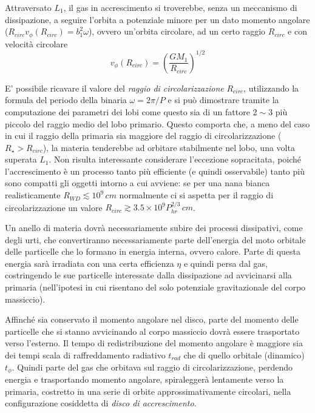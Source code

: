 \documentclass[a4paperbi]{article}
\begin{document}
	Attraversato $L_1$, il gas in accrescimento si troverebbe, senza un meccanismo di dissipazione, a seguire l'orbita a potenziale minore per un dato momento angolare ($R_{circ}v_\phi(R_{circ})=b_1^2\omega$), ovvero un'orbita circolare, ad un certo raggio $R_{circ}$ e con velocità circolare
	\begin{equation}
		v_\phi(R_{circ})=\left(\frac{GM_1}{R_{circ}}\right)^{1/2}
	\end{equation}
	
	E' possibile ricavare il valore del \textit{raggio di circolarizzazione} $R_{circ}$, utilizzando la formula del periodo della binaria $\omega=2\pi/P$ e si può dimostrare tramite la computazione dei parametri dei lobi come questo sia di un fattore $2\sim3$ più piccolo del raggio medio del lobo primario. Questo comporta che, a meno del caso in cui il raggio della primaria sia maggiore del raggio di circolarizzazione ($R_\star>R_{circ}$), la materia tenderebbe ad orbitare stabilmente nel lobo, una volta superata $L_1$.
	Non risulta interessante considerare l'eccezione sopracitata, poiché l'accrescimento è un processo tanto più efficiente (e quindi osservabile) tanto più sono compatti gli oggetti intorno a cui avviene: se per una nana bianca realisticamente $R_{WD}\lesssim10^9\,cm$ normalmente ci si aspetta per il raggio di circolarizzazione un valore $R_{circ}\gtrsim3.5\times10^9P_{hr}^{2/3}\,cm$.

	Un anello di materia dovrà necessariamente subire dei processi dissipativi, come degli urti, che convertiranno necessariamente parte dell'energia del moto orbitale delle particelle che lo formano in energia interna, ovvero calore. Parte di questa energia sarà irradiata con una certa efficienza $\eta$ e quindi persa dal gas, costringendo le sue particelle interessate dalla dissipazione ad avvicinarsi alla primaria (nell'ipotesi in cui risentano del solo potenziale gravitazionale del corpo massiccio). 
	
	Affinché sia conservato il momento angolare nel disco, parte del momento delle particelle che si stanno avvicinando al corpo massiccio dovrà essere trasportato verso l'esterno. Il tempo di redistribuzione del momento angolare è maggiore sia dei tempi scala di raffreddamento radiativo $t_{rad}$ che di quello orbitale (dinamico) $t_{\phi}$. Quindi parte del gas che orbitava sul raggio di circolarizzazione, perdendo energia e trasportando momento angolare, spiraleggerà lentamente verso la primaria, costretto in una serie di orbite approssimativamente circolari, nella configurazione cosiddetta di \textit{disco di accrescimento}. 	
	
\end{document}
